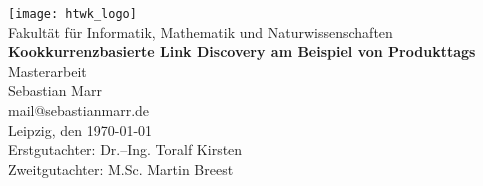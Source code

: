\thispagestyle{plain}
\begin{titlepage}
\begin{center}
\texttt{[image: htwk\_logo]}\\
\vspace{0.3cm}
\normalsize
Fakultät für Informatik, Mathematik und Naturwissenschaften\\
\vspace{2.3cm}
\huge{\textbf{\textsf{Kookkurrenzbasierte Link Discovery am Beispiel von Produkttags}}}\\
\vspace{1cm}
\LARGE{\textsf{Masterarbeit}}\\
\vspace{2.3cm}
\normalsize
Sebastian Marr\\
mail@sebastianmarr.de\\
Leipzig, den \today\\
\vspace{2.3cm}
Erstgutachter: Dr.--Ing. Toralf Kirsten \\
Zweitgutachter: M.Sc. Martin Breest
\end{center}
\end{titlepage}